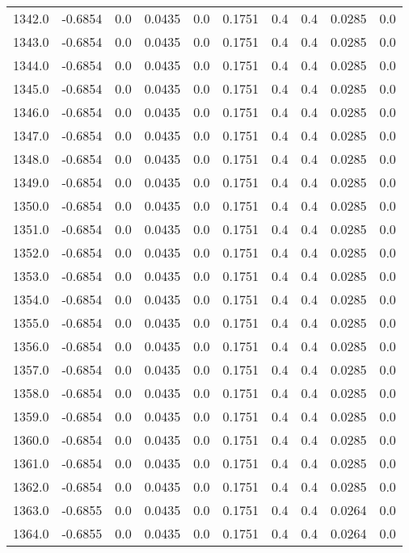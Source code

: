 \begin{longtable}{lrrrrrrrrr}
1342.0 & -0.6854 & 0.0 & 0.0435 & 0.0 & 0.1751 & 0.4 & 0.4 & 0.0285 & 0.0 \\
1343.0 & -0.6854 & 0.0 & 0.0435 & 0.0 & 0.1751 & 0.4 & 0.4 & 0.0285 & 0.0 \\
1344.0 & -0.6854 & 0.0 & 0.0435 & 0.0 & 0.1751 & 0.4 & 0.4 & 0.0285 & 0.0 \\
1345.0 & -0.6854 & 0.0 & 0.0435 & 0.0 & 0.1751 & 0.4 & 0.4 & 0.0285 & 0.0 \\
1346.0 & -0.6854 & 0.0 & 0.0435 & 0.0 & 0.1751 & 0.4 & 0.4 & 0.0285 & 0.0 \\
1347.0 & -0.6854 & 0.0 & 0.0435 & 0.0 & 0.1751 & 0.4 & 0.4 & 0.0285 & 0.0 \\
1348.0 & -0.6854 & 0.0 & 0.0435 & 0.0 & 0.1751 & 0.4 & 0.4 & 0.0285 & 0.0 \\
1349.0 & -0.6854 & 0.0 & 0.0435 & 0.0 & 0.1751 & 0.4 & 0.4 & 0.0285 & 0.0 \\
1350.0 & -0.6854 & 0.0 & 0.0435 & 0.0 & 0.1751 & 0.4 & 0.4 & 0.0285 & 0.0 \\
1351.0 & -0.6854 & 0.0 & 0.0435 & 0.0 & 0.1751 & 0.4 & 0.4 & 0.0285 & 0.0 \\
1352.0 & -0.6854 & 0.0 & 0.0435 & 0.0 & 0.1751 & 0.4 & 0.4 & 0.0285 & 0.0 \\
1353.0 & -0.6854 & 0.0 & 0.0435 & 0.0 & 0.1751 & 0.4 & 0.4 & 0.0285 & 0.0 \\
1354.0 & -0.6854 & 0.0 & 0.0435 & 0.0 & 0.1751 & 0.4 & 0.4 & 0.0285 & 0.0 \\
1355.0 & -0.6854 & 0.0 & 0.0435 & 0.0 & 0.1751 & 0.4 & 0.4 & 0.0285 & 0.0 \\
1356.0 & -0.6854 & 0.0 & 0.0435 & 0.0 & 0.1751 & 0.4 & 0.4 & 0.0285 & 0.0 \\
1357.0 & -0.6854 & 0.0 & 0.0435 & 0.0 & 0.1751 & 0.4 & 0.4 & 0.0285 & 0.0 \\
1358.0 & -0.6854 & 0.0 & 0.0435 & 0.0 & 0.1751 & 0.4 & 0.4 & 0.0285 & 0.0 \\
1359.0 & -0.6854 & 0.0 & 0.0435 & 0.0 & 0.1751 & 0.4 & 0.4 & 0.0285 & 0.0 \\
1360.0 & -0.6854 & 0.0 & 0.0435 & 0.0 & 0.1751 & 0.4 & 0.4 & 0.0285 & 0.0 \\
1361.0 & -0.6854 & 0.0 & 0.0435 & 0.0 & 0.1751 & 0.4 & 0.4 & 0.0285 & 0.0 \\
1362.0 & -0.6854 & 0.0 & 0.0435 & 0.0 & 0.1751 & 0.4 & 0.4 & 0.0285 & 0.0 \\
1363.0 & -0.6855 & 0.0 & 0.0435 & 0.0 & 0.1751 & 0.4 & 0.4 & 0.0264 & 0.0 \\
1364.0 & -0.6855 & 0.0 & 0.0435 & 0.0 & 0.1751 & 0.4 & 0.4 & 0.0264 & 0.0 \\

\end{longtable}
